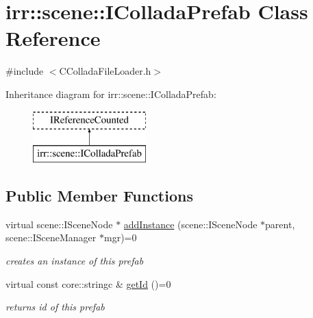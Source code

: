\hypertarget{classirr_1_1scene_1_1_i_collada_prefab}{\section{irr\-:\-:scene\-:\-:I\-Collada\-Prefab Class Reference}
\label{classirr_1_1scene_1_1_i_collada_prefab}
}


{\ttfamily \#include $<$C\-Collada\-File\-Loader.\-h$>$}

Inheritance diagram for irr\-:\-:scene\-:\-:I\-Collada\-Prefab\-:\begin{figure}[H]
\begin{center}
\leavevmode
\includegraphics[height=2.000000cm]{classirr_1_1scene_1_1_i_collada_prefab}
\end{center}
\end{figure}
\subsection*{Public Member Functions}
\begin{DoxyCompactItemize}
\item 
\hypertarget{classirr_1_1scene_1_1_i_collada_prefab_a1377044a16989bfbd138652e749f8425}{virtual scene\-::\-I\-Scene\-Node $\ast$ \hyperlink{classirr_1_1scene_1_1_i_collada_prefab_a1377044a16989bfbd138652e749f8425}{add\-Instance} (scene\-::\-I\-Scene\-Node $\ast$parent, scene\-::\-I\-Scene\-Manager $\ast$mgr)=0}\label{classirr_1_1scene_1_1_i_collada_prefab_a1377044a16989bfbd138652e749f8425}

\begin{DoxyCompactList}\small\item\em creates an instance of this prefab \end{DoxyCompactList}\item 
\hypertarget{classirr_1_1scene_1_1_i_collada_prefab_ab178500c5d60ffd19e31ef694c9eb5fb}{virtual const core\-::stringc \& \hyperlink{classirr_1_1scene_1_1_i_collada_prefab_ab178500c5d60ffd19e31ef694c9eb5fb}{get\-Id} ()=0}\label{classirr_1_1scene_1_1_i_collada_prefab_ab178500c5d60ffd19e31ef694c9eb5fb}

\begin{DoxyCompactList}\small\item\em returns id of this prefab \end{DoxyCompactList}\end{DoxyCompactItemize}


